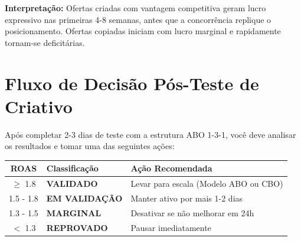 \documentclass[12pt, a4paper]{article}
\begin{document}
\begin{center}
\end{center}

\textbf{Interpretação:} Ofertas criadas com vantagem competitiva geram lucro expressivo nas primeiras 4-8 semanas, antes que a concorrência replique o posicionamento. Ofertas copiadas iniciam com lucro marginal e rapidamente tornam-se deficitárias.

\needspace{8cm}

\section{Fluxo de Decisão Pós-Teste de Criativo}

Após completar 2-3 dias de teste com a estrutura ABO 1-3-1, você deve analisar os resultados e tomar uma das seguintes ações:

\begin{table}[H]
    \centering
    \small
    \renewcommand{\arraystretch}{1.4}
    \begin{tabularx}{\textwidth}{c X X}
        \toprule
        \rowcolor{tableHeader} \textbf{ROAS} & \textbf{Classificação} & \textbf{Ação Recomendada} \\
        \midrule
        \textcolor{successGreen}{$\geq$ 1.8} & \textbf{VALIDADO} & Levar para escala (Modelo ABO ou CBO) \\
        \rowcolor{lightGray}
        \textcolor{warningOrange}{1.5 - 1.8} & \textbf{EM VALIDAÇÃO} & Manter ativo por mais 1-2 dias \\
        \textcolor{accentColor}{1.3 - 1.5} & \textbf{MARGINAL} & Desativar se não melhorar em 24h \\
        \rowcolor{lightGray}
        \textcolor{accentColor}{$<$ 1.3} & \textbf{REPROVADO} & Pausar imediatamente \\
        \bottomrule
    \end{tabularx}
\end{table}
\end{document}
